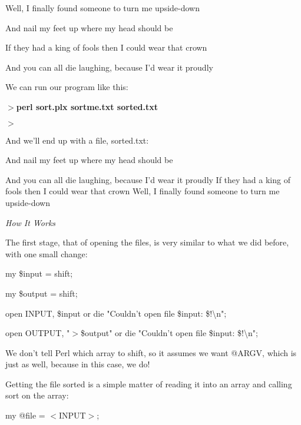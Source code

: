 \documentclass[a4paper,11pt]{book}
\begin{document}
\noindent Well, I finally found someone to turn me upside-down

\noindent And nail my feet up where my head should be

\noindent If they had a king of fools then I could wear that crown

\noindent And you can all die laughing, because I'd wear it proudly

\noindent 

\noindent 

\noindent We can run our program like this:

\noindent 

\noindent $>$\textbf{perl sort.plx sortme.txt sorted.txt}

\noindent $>$

\noindent 

\noindent And we'll end up with a file, sorted.txt:

\noindent 

\noindent And nail my feet up where my head should be

\noindent And you can all die laughing, because I'd wear it proudly If they had a king of fools then I could wear that crown Well, I finally found someone to turn me upside-down

\noindent 

\noindent \textit{How It Works}

\noindent The first stage, that of opening the files, is very similar to what we did before, with one small change:

\noindent 

\noindent my \$input = shift;

\noindent my \$output = shift;

\noindent open INPUT, \$input or die "Couldn't open file \$input: \$!\textbackslash n";

\noindent open OUTPUT, "$>$\$output" or die "Couldn't open file \$input: \$!\textbackslash n";

\noindent 

\noindent We don't tell Perl which array to shift, so it assumes we want @ARGV, which is just as well, because in this case, we do!

\noindent 

\noindent Getting the file sorted is a simple matter of reading it into an array and calling sort on the array:

\noindent 

\noindent my @file = $<$INPUT$>$;
\end{document}
